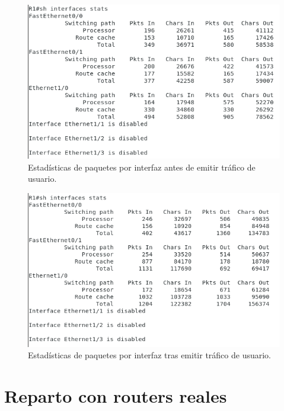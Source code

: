 \documentclass[11pt]{article}
\begin{document}
            \begin{figure}
                \centering
                \includegraphics[width=0.6\linewidth]{ifaceStatsNoBalancingStart.png}
                \caption{Estadísticas de paquetes por interfaz antes de emitir tráfico de usuario.}
                \label{fig:ifaceStatsNoBalancingStart}
            \end{figure}

            \begin{figure}
                \centering
                \includegraphics[width=0.6\linewidth]{ifaceStatsNoBalancingEnd.png}
                \caption{Estadísticas de paquetes por interfaz tras emitir tráfico de usuario.}
                \label{fig:ifaceStatsNoBalancingEnd}
            \end{figure}

    \section{Reparto con routers reales}
\end{document}
